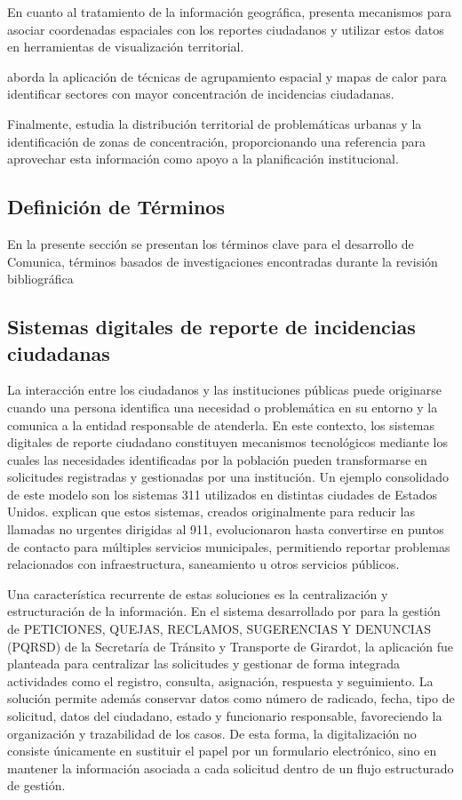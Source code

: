 En cuanto al tratamiento de la información geográfica, \textcite{rodriguezdesarrollo} presenta mecanismos para asociar coordenadas espaciales con los reportes ciudadanos y utilizar estos datos en herramientas de visualización territorial.

\textcite{izurieta2026desarrollo} aborda la aplicación de técnicas de agrupamiento espacial y mapas de calor para identificar sectores con mayor concentración de incidencias ciudadanas.

Finalmente, \textcite{moreno2026desarrollo} estudia la distribución territorial de problemáticas urbanas y la identificación de zonas de concentración, proporcionando una referencia para aprovechar esta información como apoyo a la planificación institucional.

\subsection{Definición de Términos}
En la presente sección se presentan los términos clave para el desarrollo de Comunica, términos basados de investigaciones encontradas durante la revisión bibliográfica

\subsection{Sistemas digitales de reporte de incidencias ciudadanas}
\label{subsec:sistemas_atencion}
La interacción entre los ciudadanos y las instituciones públicas puede originarse cuando una persona identifica una necesidad o problemática en su entorno y la comunica a la entidad responsable de atenderla. En este contexto, los sistemas digitales de reporte ciudadano constituyen mecanismos tecnológicos mediante los cuales las necesidades identificadas por la población pueden transformarse en solicitudes registradas y gestionadas por una institución. Un ejemplo consolidado de este modelo son los sistemas 311 utilizados en distintas ciudades de Estados Unidos. \cite{cook2024potholes} explican que estos sistemas, creados originalmente para reducir las llamadas no urgentes dirigidas al 911, evolucionaron hasta convertirse en puntos de contacto para múltiples servicios municipales, permitiendo reportar problemas relacionados con infraestructura, saneamiento u otros servicios públicos.
	
Una característica recurrente de estas soluciones es la centralización y estructuración de la información. En el sistema desarrollado por \cite{moreno2026diseno} para la gestión de PETICIONES, QUEJAS, RECLAMOS, SUGERENCIAS Y DENUNCIAS (PQRSD) de la Secretaría de Tránsito y Transporte de Girardot, la aplicación fue planteada para centralizar las solicitudes y gestionar de forma integrada actividades como el registro, consulta, asignación, respuesta y seguimiento. La solución permite además conservar datos como número de radicado, fecha, tipo de solicitud, datos del ciudadano, estado y funcionario responsable, favoreciendo la organización y trazabilidad de los casos. De esta forma, la digitalización no consiste únicamente en sustituir el papel por un formulario electrónico, sino en mantener la información asociada a cada solicitud dentro de un flujo estructurado de gestión.

